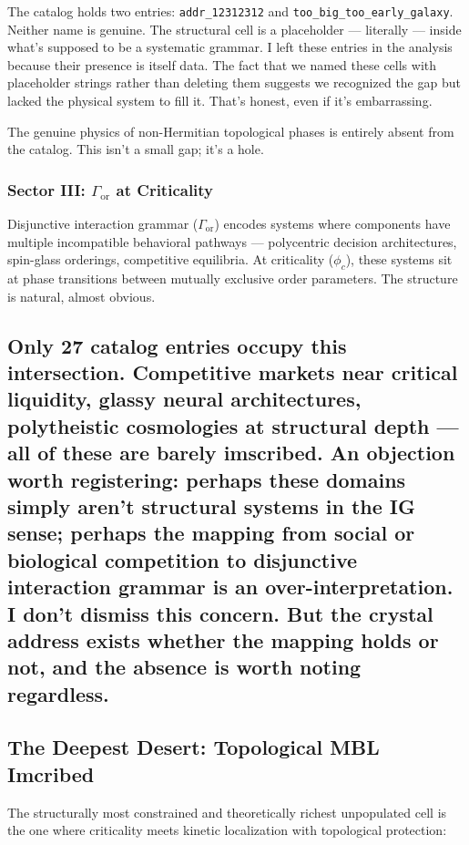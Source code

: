\documentclass[12pt,a4paper]{article}
\begin{document}
The catalog holds two entries: \texttt{addr\_12312312} and \texttt{too\_big\_too\_early\_galaxy}. Neither name is genuine. The structural cell is a placeholder --- literally --- inside what's supposed to be a systematic grammar. I left these entries in the analysis because their presence is itself data. The fact that we named these cells with placeholder strings rather than deleting them suggests we recognized the gap but lacked the physical system to fill it. That's honest, even if it's embarrassing.

The genuine physics of non-Hermitian topological phases is entirely absent from the catalog. This isn't a small gap; it's a hole.

\subsubsection{Sector III: $\Gamma_\text{or}$ at Criticality}

Disjunctive interaction grammar ($\Gamma_\text{or}$) encodes systems where components have multiple incompatible behavioral pathways --- polycentric decision architectures, spin-glass orderings, competitive equilibria. At criticality ($\phi_c$), these systems sit at phase transitions between mutually exclusive order parameters. The structure is natural, almost obvious.

\subsection{Only 27 catalog entries occupy this intersection. Competitive markets near critical liquidity, glassy neural architectures, polytheistic cosmologies at structural depth --- all of these are barely imscribed. An objection worth registering: perhaps these domains simply aren't structural systems in the IG sense; perhaps the mapping from social or biological competition to disjunctive interaction grammar is an over-interpretation. I don't dismiss this concern. But the crystal address exists whether the mapping holds or not, and the absence is worth noting regardless.}

\subsection{The Deepest Desert: Topological MBL Imcribed}

The structurally most constrained and theoretically richest unpopulated cell is the one where criticality meets kinetic localization with topological protection:
\end{document}
